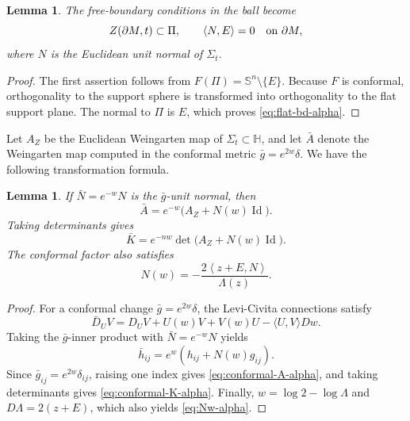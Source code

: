 \documentclass[11pt, reqno]{amsart}
\newtheorem{lemma}[theorem]{Lemma}
\theoremstyle{remark}
\theoremstyle{definition}
\numberwithin{equation}{section}
\newcommand{\Id}{\operatorname{Id}}
\newcommand{\Sph}{\mathbb S}
\newcommand{\PiH}{\Pi}
\newcommand{\bd}{\partial}
\newcommand{\ip}[2]{\left\langle #1,#2\right\rangle}
\begin{document}
\begin{lemma}\label{lem:flat-boundary-alpha}
The free-boundary conditions in the ball become
\begin{equation}\label{eq:flat-bd-alpha}
        Z(\bd M,t)\subset\PiH,
        \qquad
        \ip{N}{E}=0\quad\hbox{on }\bd M,
\end{equation}
where $N$ is the Euclidean unit normal of $\Sigma_t$.
\end{lemma}

\begin{proof}
The first assertion follows from $F(\PiH)=\Sph^n\setminus\{E\}$.  Because $F$ is conformal, orthogonality to the support sphere is transformed into orthogonality to the flat support plane.  The normal to $\PiH$ is $E$, which proves \eqref{eq:flat-bd-alpha}.
\end{proof}


Let $A_Z$ be the Euclidean Weingarten map of $\Sigma_t\subset\mathbb{H}$, and let $\bar A$ denote the Weingarten map computed in the conformal metric $\bar g=e^{2w}\delta$.  We have the following transformation formula.
\begin{lemma}
If $\bar N=e^{-w}N$ is the $\bar{g}$-unit normal, then
\begin{equation}\label{eq:conformal-A-alpha}
        \bar A=e^{-w}\big(A_Z+N(w)\Id\big).
\end{equation}
Taking determinants gives
\begin{equation}\label{eq:conformal-K-alpha}
        \bar K=e^{-nw}\det\big(A_Z+N(w)\Id\big).
\end{equation}
The conformal factor also satisfies
\begin{equation}\label{eq:Nw-alpha}
        N(w)=-\frac{2\ip{z+E}{N}}{\Lambda(z)}.
\end{equation}
\end{lemma}
\begin{proof}
For a conformal change $\bar g=e^{2w}\delta$, the Levi-Civita connections satisfy
\begin{equation*}
        \bar D_UV=D_UV+U(w)V+V(w)U-\langle U,V\rangle D w.
\end{equation*}
Taking the $\bar g$-inner product with $\bar N=e^{-w}N$ yields
\begin{equation*}
        \bar h_{ij}=e^w\left(h_{ij}+N(w)g_{ij}\right).
\end{equation*}
Since $\bar g_{ij}=e^{2w}\delta_{ij}$, raising one index gives \eqref{eq:conformal-A-alpha}, and taking determinants gives \eqref{eq:conformal-K-alpha}. Finally, $w=\log2-\log \Lambda$ and $D \Lambda=2(z+E)$, which also yields \eqref{eq:Nw-alpha}.
\end{proof}
\end{document}
